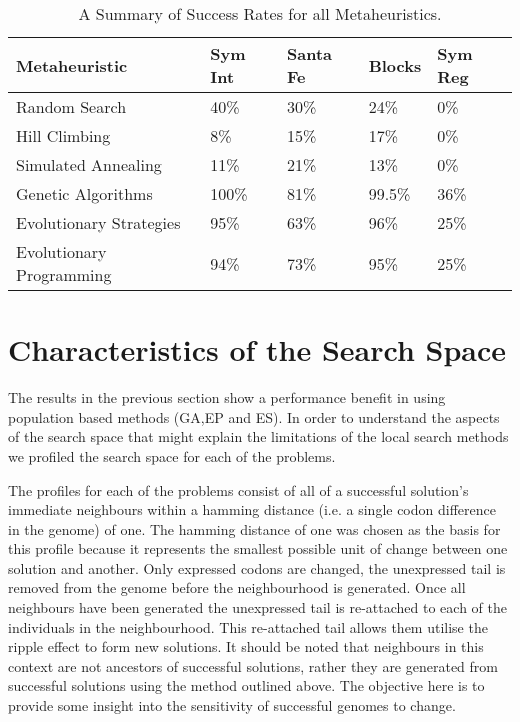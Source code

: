 \begin{table}[h]
\begin{center}
\begin{tabular}{|l|l|l|l|l|}
\hline
Metaheuristic & Sym Int & Santa Fe & Blocks & Sym Reg  \\
\hline

Random Search &              40\%    &  30\%    &  24\%    & 0\%   \\
Hill Climbing &               8\%    &  15\%    &  17\%    & 0\%    \\
Simulated Annealing &        11\%    &  21\%    &  13\%    & 0\%    \\
Genetic Algorithms &        100\%    &  81\%    &  99.5\%  & 36\%   \\
Evolutionary Strategies &    95\%    &  63\%    &  96\%    & 25\%   \\
Evolutionary Programming  &  94\%    &  73\%    &  95\%    & 25\%   \\

\hline
\end{tabular}
\caption{\label{all_results_analysis_table} A Summary of Success Rates for all Metaheuristics.}
\end{center}
\end{table}



\section{Characteristics of the Search Space}
The results in the previous section show a performance benefit in using population based methods (GA,EP and ES). In order to understand the aspects of the search space that might explain the limitations of the local search methods we profiled the search space for each of the problems.

The profiles for each of the problems consist of all of a successful solution's immediate neighbours within a hamming distance (i.e. a single codon difference in the genome) of one.  The hamming distance of one was chosen as the basis for this profile because it represents the smallest possible unit of change  between one solution and another. Only expressed codons are changed, the unexpressed tail is removed from the genome before the neighbourhood is generated. Once all neighbours have been generated the unexpressed tail is re-attached to each of the individuals in the neighbourhood. This re-attached tail allows them utilise the ripple effect to form new solutions. It should be noted that neighbours in this context are not ancestors of successful solutions, rather they are generated from successful solutions using the method outlined above. The objective here is to provide some insight into the sensitivity of successful genomes to change.

